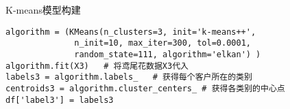 \documentclass[t]{beamer}
\begin{document}
\begin{frame}[fragile]{K-means模型构建}
\begin{lstlisting}
algorithm = (KMeans(n_clusters=3, init='k-means++', 
              n_init=10, max_iter=300, tol=0.0001,
              random_state=111, algorithm='elkan') ) 
algorithm.fit(X3)   # 将鸢尾花数据X3代入
labels3 = algorithm.labels_   # 获得每个客户所在的类别
centroids3 = algorithm.cluster_centers_ # 获得各类别的中心点 
df['label3'] = labels3
\end{lstlisting}
\end{frame}
\end{document}
